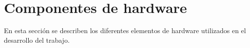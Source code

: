 
\section{Componentes de hardware}\label{sec:hardware}

En esta sección se describen los diferentes elementos de hardware utilizados en
el desarrollo del trabajo. %

